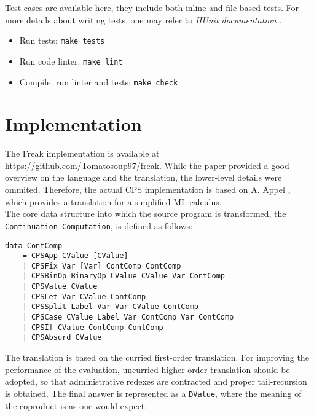 \documentclass{article}
\theoremstyle{definition}
\theoremstyle{lemma}
\theoremstyle{observation}
\theoremstyle{theorem}
\begin{document}
    Test cases are available \href{https://github.com/Tomatosoup97/freak/blob/master/src/Tests.hs}{\underline{here}},
    they include both inline and file-based tests. For more details about
    writing tests, one may refer to \textit{HUnit documentation} \cite{hunit-docs}. \\

    \begin{itemize}
        \item Run tests: \verb!make tests!
        \item Run code linter: \verb!make lint!
        \item Compile, run linter and tests: \verb!make check!
    \end{itemize}

\section{Implementation}

    The Freak implementation is available at \href{https://github.com/Tomatosoup97/freak}{https://github.com/Tomatosoup97/freak}.
    While the paper provided a good overview on the language and the translation,
    the lower-level details were ommited. Therefore, the actual CPS implementation
    is based on A. Appel \cite{appel-continuations}, which provides a translation
    for a simplified ML calculus. \\

    The core data structure into which the source program is transformed,
    the \verb!Continuation Computation!, is defined as follows:

    \begin{verbatim}
data ContComp
    = CPSApp CValue [CValue]
    | CPSFix Var [Var] ContComp ContComp
    | CPSBinOp BinaryOp CValue CValue Var ContComp
    | CPSValue CValue
    | CPSLet Var CValue ContComp
    | CPSSplit Label Var Var CValue ContComp
    | CPSCase CValue Label Var ContComp Var ContComp
    | CPSIf CValue ContComp ContComp
    | CPSAbsurd CValue
    \end{verbatim}

    The translation is based on the curried first-order translation. For
    improving the performance of the evaluation, uncurried higher-order translation
    should be adopted, so that administrative redexes are contracted and
    proper tail-recursion is obtained. The final answer is represented as a \verb!DValue!,
    where the meaning of the coproduct is as one would expect:
\end{document}
